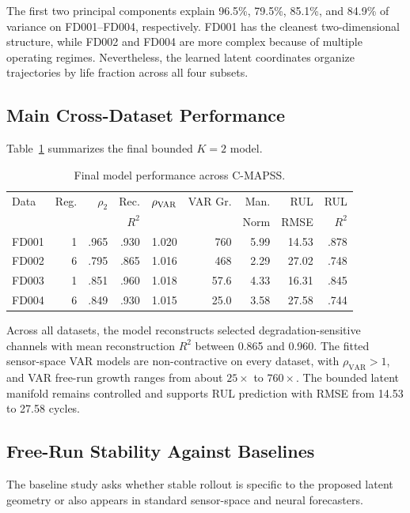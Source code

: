 \documentclass[a4paper,fleqn]{cas-sc}
\newcommand{\tinytable}{\scriptsize}
\newcommand{\verytighttables}{%
  \setlength{\tabcolsep}{3.5pt}%
  \renewcommand{\arraystretch}{1.05}%
}
\begin{document}
The first two principal components explain 96.5\%, 79.5\%, 85.1\%, and 84.9\%
of variance on FD001--FD004, respectively. FD001 has the cleanest
two-dimensional structure, while FD002 and FD004 are more complex because of
multiple operating regimes. Nevertheless, the learned latent coordinates
organize trajectories by life fraction across all four subsets.

\subsection{Main Cross-Dataset Performance}

Table~\ref{tab:main-cross} summarizes the final bounded $K=2$ model.

\begin{table}[t]
\centering
\caption{Final model performance across C-MAPSS.}
\label{tab:main-cross}
\tinytable
\verytighttables
\begin{tabular}{@{}lrrrrrrrr@{}}
\toprule
Data & Reg. & $\rho_2$ & Rec. & $\rho_{\rm VAR}$ & VAR Gr. & Man. & RUL & RUL \\
     &      &          & $R^2$ &                 &          & Norm & RMSE & $R^2$ \\
\midrule
FD001 & 1 & .965 & .930 & 1.020 & 760 & 5.99 & 14.53 & .878 \\
FD002 & 6 & .795 & .865 & 1.016 & 468 & 2.29 & 27.02 & .748 \\
FD003 & 1 & .851 & .960 & 1.018 & 57.6 & 4.33 & 16.31 & .845 \\
FD004 & 6 & .849 & .930 & 1.015 & 25.0 & 3.58 & 27.58 & .744 \\
\bottomrule
\end{tabular}
\end{table}

Across all datasets, the model reconstructs selected degradation-sensitive
channels with mean reconstruction $R^2$ between 0.865 and 0.960. The fitted
sensor-space VAR models are non-contractive on every dataset, with
$\rho_{\mathrm{VAR}}>1$, and VAR free-run growth ranges from about $25\times$
to $760\times$. The bounded latent manifold remains controlled and supports
RUL prediction with RMSE from 14.53 to 27.58 cycles.

\subsection{Free-Run Stability Against Baselines}

The baseline study asks whether stable rollout is specific to the proposed
latent geometry or also appears in standard sensor-space and neural forecasters.
\end{document}
